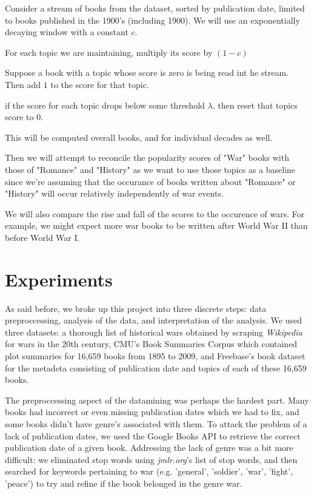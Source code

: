 \documentclass[twoside]{article}
\begin{document}
\begin{multicols}{2}
Consider a stream of books from the dataset, sorted by publication date, limited to books published in the 1900's (including 1900). We will use an exponentially decaying window with a constant $c$.

\begin{compactitem}
    \item For each topic we are maintaining, multiply its score by $(1 - c)$
    \item Suppose a book with a topic whose score is zero is being read int he stream. Then add $1$ to the score for that topic.
    \item if the score for each topic drops below some threshold $\lambda$, then reset that topics score to 0.
\end{compactitem}
      
This will be computed overall books, and for individual decades as well.

Then we will attempt to reconcile the popularity scores of "War" books with those of "Romance" and "History" as we want to use those topics as a baseline since we're assuming that the occurance of books written about "Romance" or "History" will occur relatively independently of war events. 

We will also compare the rise and fall of the scores to the occurence of wars. For example, we might expect more war books to be written after World War II than before World War I. 
\section{Experiments}
As said before, we broke up this project into three discrete steps: data preproccessing, analysis of the data, and interpretation of the analysis. We used three datasets: a thorough list of historical wars obtained by scraping \textit{Wikipedia} for wars in the 20th century, CMU's Book Summaries Corpus which contained plot summaries for 16,659 books from 1895 to 2009, and Freebase's book dataset for the metadeta consisting of publication date and topics of each of these 16,659 books.

The preproccessing aspect of the datamining was perhaps the hardest part. Many books had incorrect or even missing publication dates which we had to fix, and some books didn't have genre's associated with them. To attack the problem of a lack of publication dates, we used the Google Books API to retrieve the correct publication date of a given book. Addressing the lack of genre was a bit more difficult: we eliminated stop words using \textit{jmlr.org}'s list of stop words, and then searched for keywords pertaining to war (e.g. 'general', 'soldier', 'war', 'fight', 'peace') to try and refine if the book belonged in the genre war. 


\end{multicols}
\end{document}
